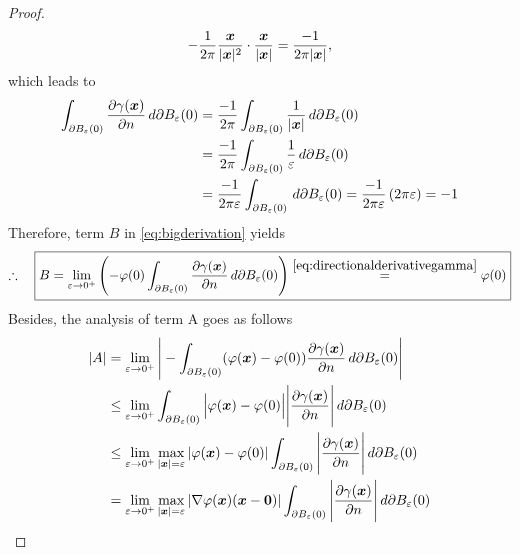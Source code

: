 \documentclass[12pt]{article}
\begin{document}
\begin{proof}
\begin{align*}
		-\frac{1}{2\pi}\frac{{\boldsymbol{\mathnormal x}}}{|{\boldsymbol{\mathnormal x}}|^2} \cdot\frac{{\boldsymbol{\mathnormal x}}}{|{\boldsymbol{\mathnormal x}}|}=\frac{-1}{2\pi|{\boldsymbol{\mathnormal x}}|},
	\end{align*}
	which leads to
	\begin{align}
		\label{eq:directionalderivativegamma}
		\int_{\partial B_\varepsilon(0)}
		\frac{\partial\gamma({\boldsymbol{\mathnormal x}})}{\partial n}\, d\partial B_\varepsilon(0)
		 & = \frac{-1}{2\pi}
		\int_{\partial B_\varepsilon(0)}\frac{1}{|{\boldsymbol{\mathnormal x}}|}\, d\partial B_\varepsilon(0)       \notag \\
		 & = \frac{-1}{2\pi}
		\int_{\partial B_\varepsilon(0)}\frac{1}{\varepsilon}\, d\partial B_\varepsilon(0) \notag \\
		 & = \frac{-1}{2\pi\varepsilon}
		\int_{\partial B_\varepsilon(0)}\, d\partial B_\varepsilon(0)
		= \frac{-1}{2\pi\varepsilon} \left( 2\pi \varepsilon \right)
		= -1
	\end{align}
	Therefore, term $B$ in \eqref{eq:bigderivation} yields 
	\begin{align}
		\label{eq:TermBfinal}
		\therefore\quad
		\boxed{
			B = \lim_{\varepsilon\to 0^+}
			\left(
			-\varphi(0)\int_{\partial B_\varepsilon(0)}
			\frac{\partial\gamma({\boldsymbol{\mathnormal x}})}{\partial n}\, d\partial B_{\varepsilon}(0) \right) 
			\stackrel{\eqref{eq:directionalderivativegamma}}{=} \varphi(0)
		}
	\end{align}
	Besides, the analysis of term A goes as follows
	\begin{align}
		|A| & = \lim_{\varepsilon\to 0^+}
		\Bigg|
		- \int_{\partial B_\varepsilon(0)} (\varphi(\Bx)-\varphi(0))
		\frac{\partial\gamma(\Bx)}{\partial n}\, d\partial B_\varepsilon(0)
		\Bigg|                                                                                       \notag \\
		    & \leq \lim_{\varepsilon\to 0^+}
		\int_{\partial B_\varepsilon(0)}
		\Big|\varphi(\Bx)-\varphi(0)\Big|
		\Bigg|\frac{\partial\gamma(\Bx)}{\partial n}\Bigg|
		\, d\partial B_\varepsilon(0)                                                                \notag \\
		    & \leq  
		\lim_{\varepsilon\to 0^+}
		\max_{|\Bx|=\varepsilon}{|\varphi(\Bx)-\varphi(0)|}
		\int_{\partial B_\varepsilon(0)}
		\Bigg|\frac{\partial\gamma(\Bx)}{\partial n}\Bigg|\, d\partial B_\varepsilon(0)              \notag \\
		    & =
		\lim_{\varepsilon\to 0^+}
		\max_{|\Bx|=\varepsilon}{|\nabla\varphi(\Bx) (\Bx - \mathbf{0})|}
		\int_{\partial B_\varepsilon(0)}
		\Bigg|\frac{\partial\gamma(\Bx)}{\partial n}\Bigg|\, d\partial B_\varepsilon(0)              \notag \\

\end{align}
\end{proof}
\end{document}
